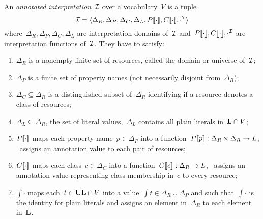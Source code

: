 \begin{definition}
  An \emph{annotated interpretation}~$\mathcal{I}$ over a vocabulary~$V$ is a tuple
  \[\mathcal{I}=\langle \Delta_{R}, \Delta_{P}, \Delta_{C}, \Delta_{L}, {P[\![\cdot]\!]}, {C[\![\cdot]\!]}, {\cdot}^{\mathcal{I}} \rangle\]
  where~$\Delta_{R}, \Delta_{P}, \Delta_{C}, \Delta_{L}$ are interpretation domains of~$\mathcal{I}$ and~${P[\![\cdot]\!]},
  {C[\![\cdot]\!]}, {\cdot}^{\mathcal{I}}$ are interpretation functions of~$\mathcal{I}$.
  They have to satisfy:
  \begin{enumerate}
  \item $\Delta_{R}$ is a nonempty finite set of resources, called the domain or universe of~$\mathcal{I}$;
  \item $\Delta_{P}$ is a finite set of property names (not necessarily disjoint from~$\Delta_{R}$);
  \item $\Delta_{C} \subseteq \Delta_{R}$ is a distinguished subset of~$\Delta_{R}$ identifying if a resource denotes a
    class of resources;
  \item $\Delta_{L} \subseteq \Delta_{R}$, the set of literal values,~$\Delta_{L}$ contains all plain literals in~$\mathbf{L}
    \cap V$;
  \item\label{item5} ${P[\![\cdot]\!]}$ maps each property name~$p \in \Delta_{P}$ into a function~${P[\![p]\!]}: \Delta_{R}
    \times \Delta_{R}\to L$, \ie~assigns an annotation value to each pair of resources;
  \item\label{item6} ${C[\![\cdot]\!]}$ maps each class~$c \in \Delta_{C}$ into a function~${C[\![c]\!]} : \Delta_{R} \to L$,
    \ie~assigns an annotation value representing class membership in~$c$ to every resource;
  \item $\int{\cdot}$ maps each~$t \in \mathbf{UL} \cap V$ into a value~$\int{t} \in \Delta_{R} \cup \Delta_{P}$ and such
    that~$\int{\cdot}$ is the identity for plain literals and assigns an element in~$\Delta_{R}$ to each element
    in~$\mathbf{L}$.
  \end{enumerate}
\end{definition}


